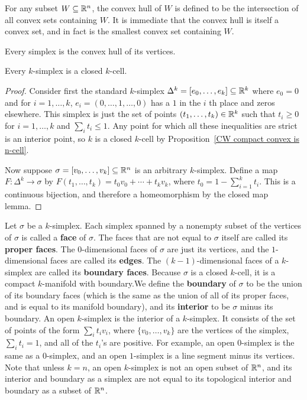 For any subset $W\subseteq\mathbb{R}^n$, the convex hull of $W$ is defined to be the intersection of all convex sets containing $W$. It is immediate that the convex hull is itself a convex set, and in fact is the smallest convex set containing $W$.
\begin{proposition}
Every simplex is the convex hull of its vertices.
\end{proposition}
\begin{proposition}
Every $k$-simplex is a closed $k$-cell.
\end{proposition}
\begin{proof}
Consider first the standard $k$-simplex $\Delta^k=[e_0,\dots,e_k]\subseteq\mathbb{R}^k$ where $e_0=0$ and for $i=1,\dots,k$, $e_i=(0,\dots,1,\dots,0)$ has a $1$ in the $i$ th place and zeros elsewhere. This simplex is just the set of points $(t_1,\dots,t_k)\in\mathbb{R}^k$ such that $t_i\geq0$ for $i=1,\dots,k$ and $\sum_it_i\leq1$. Any point for which all these inequalities are strict is an
interior point, so $k$ is a closed $k$-cell by Proposition~\ref{CW compact convex is n-cell}.\par
Now suppose $\sigma=[v_0,\dots,v_k]\subseteq\mathbb{R}^n$ is an arbitrary $k$-simplex. Define a map $F:\Delta^k\to\sigma$ by $F(t_1,\dots,t_k)=t_0v_0+\cdots+t_kv_k$, where $t_0=1-\sum_{i=1}^{k}t_i$. This is a continuous bijection, and therefore a homeomorphism by the closed map lemma.
\end{proof}
Let $\sigma$ be a $k$-simplex. Each simplex spanned by a nonempty subset of the vertices of $\sigma$ is called a \textbf{face} of $\sigma$. The faces that are not equal to $\sigma$ itself are called its \textbf{proper faces}. The $0$-dimensional faces of $\sigma$ are just its vertices, and the $1$-dimensional faces are called its \textbf{edges}. The $(k-1)$-dimensional faces of a $k$-simplex are called
its \textbf{boundary faces}. Because $\sigma$ is a closed $k$-cell, it is a compact $k$-manifold with boundary.We define the \textbf{boundary} of $\sigma$ to be the union of its boundary faces (which is the same as the union of all of its proper faces, and is equal to its manifold boundary), and its \textbf{interior} to be $\sigma$ minus its boundary. An open $k$-simplex is the interior of a $k$-simplex. It consists of the set of points of the form $\sum_it_iv_i$, where $\{v_0,\dots,v_k\}$ are the vertices of the simplex, $\sum_it_i=1$, and all of the $t_i$'s are positive. For example, an open $0$-simplex is the same as a $0$-simplex, and an open $1$-simplex is a line segment minus its vertices. Note that unless $k=n$, an open $k$-simplex is not an open subset of $\mathbb{R}^n$, and its interior and boundary as a simplex are not equal to its topological interior and boundary as a subset of $\mathbb{R}^n$.\par
